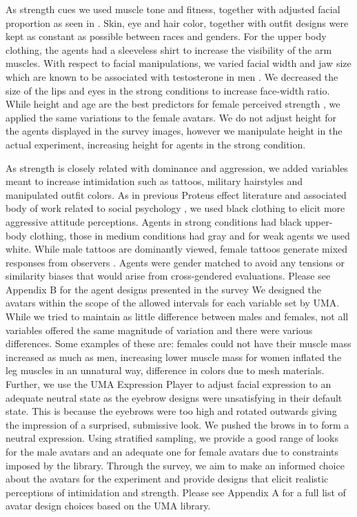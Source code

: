 As strength cues we used muscle tone and fitness, together with adjusted facial proportion as seen in \cite{windhager2011geometric}. Skin, eye and hair color, together with outfit designs were kept as constant as possible between races and genders. For the upper body clothing, the agents had a sleeveless shirt to increase the visibility of the arm muscles. 
With respect to facial manipulations, we varied facial width and jaw size which are known to be associated with testosterone in men \cite{lefevre2013telling}. We decreased the size of the lips and eyes in the strong conditions to increase face-width ratio. While height and age are the best predictors for female perceived strength \cite{sell2008human}, we applied the same variations to the female avatars. We do not adjust height for the agents displayed in the survey images, however we manipulate height in the actual experiment, increasing height for agents in the strong condition.  

As strength is closely related with dominance and aggression, we added variables meant to increase intimidation such as tattoos, military hairstyles and manipulated outfit colors. As in previous Proteus effect literature and associated body of work related to social psychology \cite{yee2009proteus,pena2009priming}, we used black clothing to elicit more aggressive attitude perceptions. Agents in strong conditions had black upper-body clothing, those in medium conditions had gray and for weak agents we used white. While male tattoos are dominantly viewed, female tattoos generate mixed responses from observers \cite{wohlrab2009perception}. Agents were gender matched to avoid any tensions or similarity biases that would arise from cross-gendered evaluations. Please see Appendix B for the agent designs presented in the survey
We designed the avatars within the scope of the allowed intervals for each variable set by UMA. While we tried to maintain as little difference between males and females, not all variables offered the same magnitude of variation and there were various differences. Some examples of these are: females could not have their muscle mass increased as much as men, increasing lower muscle mass for women inflated the leg muscles in an unnatural way, difference in colors due to mesh materials. Further, we use the UMA Expression Player to adjust facial expression to an adequate neutral state as the eyebrow designs were unsatisfying in their default state. This is because the eyebrows were too high and rotated outwards giving the impression of a surprised, submissive look. We pushed the brows in to form a neutral expression.
Using stratified sampling, we provide a good range of looks for the male avatars and an adequate one for female avatars due to constraints imposed by the library. Through the survey, we aim to make an informed choice about the avatars for the experiment and provide designs that elicit realistic perceptions of intimidation and strength. Please see Appendix A for a full list of avatar design choices based on the UMA library.

